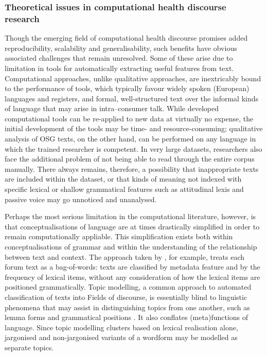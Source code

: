 \subsubsection{Theoretical issues in computational health discourse research}

Though the emerging field of computational health discourse promises added reproducibility, scalability and generalisability, such benefits have obvious associated challenges that remain unresolved. Some of these arise due to limitation in tools for automatically extracting useful features from text. Computational approaches, unlike qualitative approaches, are inextricably bound to the performance of tools, which typically favour widely spoken (European) languages and registers, and formal, well\hyp{}structured text over the informal kinds of language that may arise in intra--consumer talk. While developed computational tools can be re\hyp{}applied to new data at virtually no expense, the initial development of the tools may be time\hyp{} and resource\hyp{}consuming; qualitative analysis of \gls{OSG} texts, on the other hand, can be performed on any language in which the trained researcher is competent. In very large datasets, researchers also face the additional problem of not being able to read through the entire \gls{corpus} manually. There always remains, therefore, a possibility that inappropriate texts are included within the dataset, or that kinds of meaning not indexed with specific lexical or shallow grammatical features such as attitudinal lexis and passive voice may go unnoticed and unanalysed.

Perhaps the most serious limitation in the computational literature, however, is that conceptualisations of language are at times drastically simplified in order to remain computationally appliable. This simplification exists both within conceptualisations of grammar and within the understanding of the relationship between text and context. The approach taken by \textcite{maclean_forum77:_2015}, for example, treats each \gls{forum} text as a bag\hyp{}of\hyp{}words: texts are classified by metadata feature and by the frequency of lexical items, without any consideration of how the lexical items are positioned grammatically. Topic modelling, a common approach to automated classification of texts into Fields of discourse, is essentially blind to linguistic phenomena that may assist in distinguishing topics from one another, such as lemma forms and grammatical positions \cite{delpisheh_topic_2014,boyd-graber_syntactic_2009}. %
It also conflates (meta)functions of language. Since topic modelling clusters based on lexical realisation alone, jargonised and non\hyp{}jargonised variants of a wordform may be modelled as separate topics.


